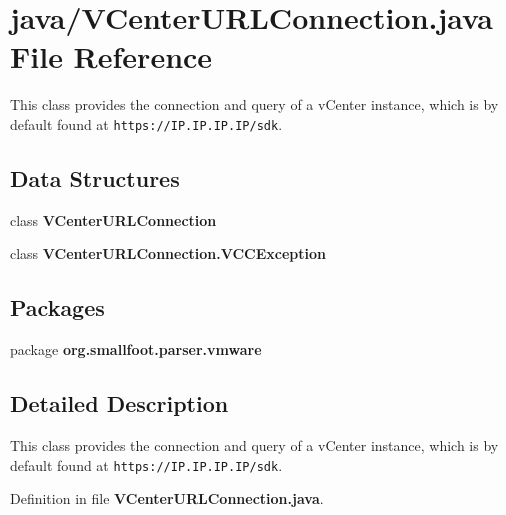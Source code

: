 \section{java/\+V\+Center\+U\+R\+L\+Connection.java File Reference}
\label{VCenterURLConnection_8java}


This class provides the connection and query of a v\+Center instance, which is by default found at {\tt https\+://\+I\+P.\+I\+P.\+I\+P.\+I\+P/sdk}.  


\subsection*{Data Structures}
\begin{DoxyCompactItemize}
\item 
class {\bf V\+Center\+U\+R\+L\+Connection}
\item 
class {\bf V\+Center\+U\+R\+L\+Connection.\+V\+C\+C\+Exception}
\end{DoxyCompactItemize}
\subsection*{Packages}
\begin{DoxyCompactItemize}
\item 
package {\bf org.\+smallfoot.\+parser.\+vmware}
\end{DoxyCompactItemize}


\subsection{Detailed Description}
This class provides the connection and query of a v\+Center instance, which is by default found at {\tt https\+://\+I\+P.\+I\+P.\+I\+P.\+I\+P/sdk}. 



Definition in file {\bf V\+Center\+U\+R\+L\+Connection.\+java}.

